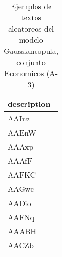 \begin{table}[H]
\centering
\fontsize{8}{14}\selectfont
\caption{Ejemplos de textos aleatoreos del modelo Gaussiancopula, conjunto Economicos (A-3)}
\label{table-sample10-economicos-a-3-gaussiancopula-text}
\begin{tabular}{|m{50em}|}
\hline
\rowcolor[gray]{0.8}
description \\
\hline AAInz \\
\hline AAEnW \\
\hline AAAxp \\
\hline AAAfF \\
\hline AAFKC \\
\hline AAGwc \\
\hline AADio \\
\hline AAFNq \\
\hline AAABH \\
\hline AACZb \\
\hline
\end{tabular}
\end{table}
